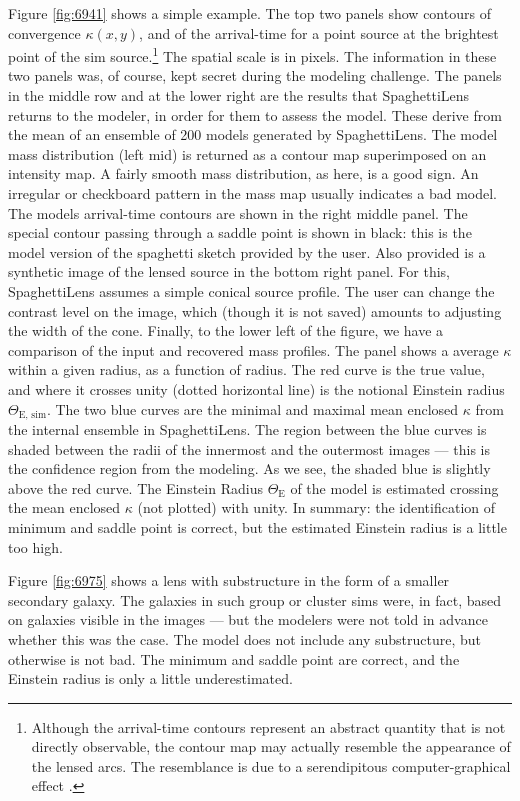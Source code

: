 \documentclass[12pt,preprint]{aastex}
\newcommand{\spl}{SpaghettiLens\xspace}
\begin{document}
Figure \ref{fig:6941} shows a simple example.  The top two panels show
contours of convergence $\kappa(x,y)$, and of the arrival-time for a
point source at the brightest point of the sim
source.\footnote{Although the arrival-time contours represent an
  abstract quantity that is not directly observable, the contour map
  may actually resemble the appearance of the lensed arcs.  The
  resemblance is due to a serendipitous computer-graphical effect
  \citep{2001AJ....122..585S}.} The spatial scale is in pixels.  The
information in these two panels was, of course, kept secret during the
modeling challenge.  The panels in the middle row and at the lower
right are the results that \spl returns to the modeler, in order for
them to assess the model.  These derive from the mean of an ensemble
of 200 models generated by \spl.  The model mass distribution (left mid) is
returned as a contour map superimposed on an intensity map. A fairly
smooth mass distribution, as here, is a good sign.  An irregular or
checkboard pattern in the mass map usually indicates a bad model.  The
models arrival-time contours are shown in the right middle panel.
  The special contour passing through a
saddle point is shown in black: this is the model version of the
spaghetti sketch provided by the user.  Also provided is a synthetic
image of the lensed source in the bottom right panel.
  For this, \spl assumes a simple conical
source profile.  The user can change the contrast level on the image,
which (though it is not saved) amounts to adjusting the width of
the cone.  Finally, to the lower left of the figure, we have a
comparison of the input and recovered mass profiles.  The panel shows
a average $\kappa$ within a given radius, as a function of radius.
The red curve is the true value, and where it crosses unity (dotted
horizontal line) is the notional Einstein radius $\Theta_{\text{E, sim}}$.
  The two blue curves
are the minimal and maximal mean enclosed $\kappa$ from the internal
ensemble in \spl.  The region between the blue curves is shaded
between the radii of the innermost and the outermost images --- this
is the confidence region from the modeling.  As we see, the shaded
blue is slightly above the red curve. 
The Einstein Radius $\Theta_\text{E}$ of the model is estimated crossing the
mean enclosed $\kappa$ (not plotted) with unity.
  In summary: the identification
of minimum and saddle point is correct, but the estimated Einstein
radius is a little too high.

Figure \ref{fig:6975} shows a lens with substructure in the form of a
smaller secondary galaxy.  The galaxies in such group or cluster sims
were, in fact, based on galaxies visible in the images --- but the
modelers were not told in advance whether this was the case.  The
model does not include any substructure, but otherwise is not bad.
The minimum and saddle point are correct, and the Einstein radius is
only a little underestimated.
\end{document}
